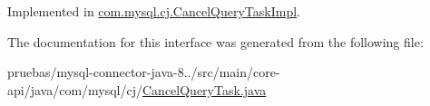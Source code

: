 Implemented in \mbox{\hyperlink{classcom_1_1mysql_1_1cj_1_1_cancel_query_task_impl_a8091c01445defc1368fb90fab42eca5d}{com.\+mysql.\+cj.\+Cancel\+Query\+Task\+Impl}}.



The documentation for this interface was generated from the following file\+:\begin{DoxyCompactItemize}
\item 
pruebas/mysql-\/connector-\/java-\/8../src/main/core-\/api/java/com/mysql/cj/\mbox{\hyperlink{_cancel_query_task_8java}{Cancel\+Query\+Task.\+java}}\end{DoxyCompactItemize}
